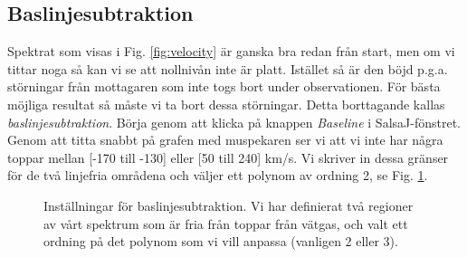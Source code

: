 \documentclass[11pt,swedish,a4paper]{article}
\begin{document}
\subsection{Baslinjesubtraktion}
Spektrat som visas i Fig. \ref{fig:velocity} är ganska bra redan från start, men om 
vi tittar noga så kan vi se att nollnivån inte är platt. Istället så är den böjd
p.g.a. störningar från mottagaren som inte togs bort under observationen. 
För bästa möjliga resultat så måste vi ta bort dessa störningar. Detta borttagande
kallas \emph{baslinjesubtraktion}. Börja genom att klicka på knappen \emph{Baseline} 
i SalsaJ-fönstret. Genom att titta snabbt på grafen med muspekaren ser vi att vi inte
har några toppar mellan [-170 till -130] eller [50 till 240] km/s. 
Vi skriver in dessa gränser för de två linjefria områdena och väljer ett polynom av 
ordning 2, se Fig. \ref{fig:baseline}.

\begin{figure}[h!]
  \centering
  \caption{Inställningar för baslinjesubtraktion. Vi har definierat två regioner
	  av vårt spektrum som är fria från toppar från vätgas, och valt ett ordning på 
	  det polynom som vi vill anpassa (vanligen 2 eller 3). 
  }
  \label{fig:baseline}
\end{figure}
\end{document}
